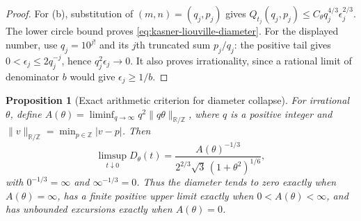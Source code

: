 \documentclass[10pt,a4paper]{article}
\numberwithin{equation}{section}
\newtheorem{proposition}[theorem]{Proposition}
\theoremstyle{definition}
\theoremstyle{remark}
\newcommand{\R}{\mathbb R}
\begin{document}
\begin{proof}
For \textup{(b)}, substitution of $(m,n)=(q_j,p_j)$ gives
$Q_{t_j}(q_j,p_j)\le C_\theta q_j^{4/3}\epsilon_j^{2/3}$.
The lower circle bound proves \eqref{eq:kasner-liouville-diameter}.
For the displayed number, use $q_j=10^{j!}$ and its $j$th truncated
sum $p_j/q_j$: the positive tail gives
$0<\epsilon_j\le2q_j^{-j}$, hence $q_j^2\epsilon_j\to0$.
It also proves irrationality, since a rational limit of denominator
$b$ would give $\epsilon_j\ge1/b$.
\end{proof}

\begin{proposition}[Exact arithmetic criterion for diameter collapse]
\label{prop:kasner-arithmetic-criterion}
For irrational $\theta$, define
$A(\theta)=\liminf_{q\to\infty}q^2\|q\theta\|_{\R/\mathbb Z}$,
where $q$ is a positive integer and
$\|v\|_{\R/\mathbb Z}=\min_{p\in\mathbb Z}|v-p|$.
Then
\begin{equation}
 \limsup_{t\downarrow0}D_\theta(t)
 =\frac{A(\theta)^{-1/3}}
 {2^{2/3}\sqrt3\,(1+\theta^2)^{1/6}},
 \label{eq:kasner-exact-diameter-limsup}
\end{equation}
with $0^{-1/3}=\infty$ and $\infty^{-1/3}=0$.
Thus the diameter tends to zero exactly when $A(\theta)=\infty$,
has a finite positive upper limit exactly when $0<A(\theta)<\infty$,
and has unbounded excursions exactly when $A(\theta)=0$.
\end{proposition}
\end{document}
